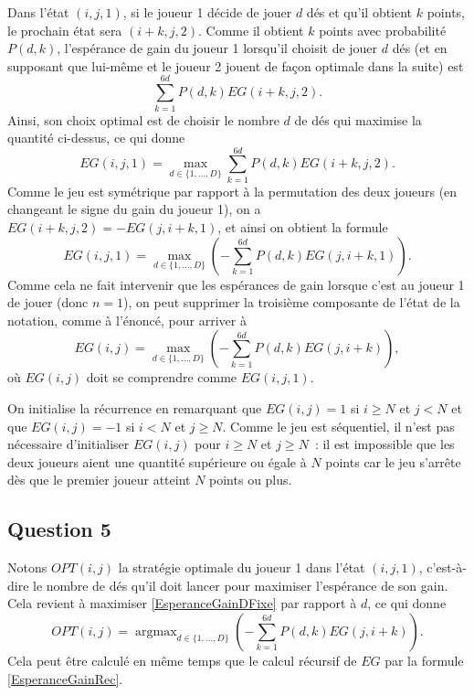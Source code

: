 \documentclass[a4paper,11pt]{amsart}
\theoremstyle{plain}
\DeclareMathOperator*{\argmax}{argmax}
\begin{document}
Dans l'état $(i, j, 1)$, si le joueur 1 décide de jouer $d$ dés et qu'il obtient $k$ points, le prochain état sera $(i+k, j, 2)$. Comme il obtient $k$ points avec probabilité $P(d, k)$, l'espérance de gain du joueur 1 lorsqu'il choisit de jouer $d$ dés (et en supposant que lui-même et le joueur 2 jouent de façon optimale dans la suite) est
\begin{equation}
\label{EsperanceGainDFixe}
\sum_{k=1}^{6d} P(d, k) EG(i+k, j, 2).
\end{equation}
Ainsi, son choix optimal est de choisir le nombre $d$ de dés qui maximise la quantité ci-dessus, ce qui donne
\[
EG(i, j, 1) = \max_{d \in \{1, \dotsc, D\}} \sum_{k=1}^{6d} P(d, k) EG(i+k, j, 2).
\]
Comme le jeu est symétrique par rapport à la permutation des deux joueurs (en changeant le signe du gain du joueur 1), on a $EG(i+k, j, 2) = -EG(j, i+k, 1)$, et ainsi on obtient la formule
\[
EG(i, j, 1) = \max_{d \in \{1, \dotsc, D\}} \left(-\sum_{k=1}^{6d} P(d, k) EG(j, i+k, 1)\right).
\]
Comme cela ne fait intervenir que les espérances de gain lorsque c'est au joueur 1 de jouer (donc $n = 1$), on peut supprimer la troisième composante de l'état de la notation, comme à l'énoncé, pour arriver à
\begin{equation}
\label{EsperanceGainRec}
EG(i, j) = \max_{d \in \{1, \dotsc, D\}} \left(-\sum_{k=1}^{6d} P(d, k) EG(j, i+k)\right),
\end{equation}
où $EG(i, j)$ doit se comprendre comme $EG(i, j, 1)$.

On initialise la récurrence en remarquant que $EG(i, j) = 1$ si $i \geq N$ et $j < N$ et que $EG(i, j) = -1$ si $i < N$ et $j \geq N$. Comme le jeu est séquentiel, il n'est pas nécessaire d'initialiser $EG(i, j)$ pour $i \geq N$ et $j \geq N$~: il est impossible que les deux joueurs aient une quantité supérieure ou égale à $N$ points car le jeu s'arrête dès que le premier joueur atteint $N$ points ou plus.

\subsection{Question 5}

Notons $OPT(i, j)$ la stratégie optimale du joueur 1 dans l'état $(i, j, 1)$, c'est-à-dire le nombre de dés qu'il doit lancer pour maximiser l'espérance de son gain. Cela revient à maximiser \eqref{EsperanceGainDFixe} par rapport à $d$, ce qui donne
\[
OPT(i, j) = \argmax_{d \in \{1, \dotsc, D\}} \left(-\sum_{k=1}^{6d} P(d, k) EG(j, i+k)\right).
\]
Cela peut être calculé en même temps que le calcul récursif de $EG$ par la formule \eqref{EsperanceGainRec}.
\end{document}
